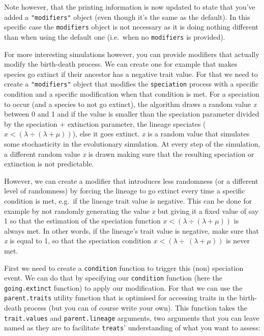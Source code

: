 \documentclass[
]{book}
\begin{document}
Note however, that the printing information is now updated to state that you've added a \texttt{"modifiers"} object (even though it's the same as the default).
In this specific case the \texttt{modifiers} object is not necessary as it is doing nothing different than when using the default one (i.e.~when no \texttt{modifiers} is provided).

For more interesting simulations however, you can provide modifiers that actually modify the birth-death process.
We can create one for example that makes species go extinct if their ancestor has a negative trait value.
For that we need to create a \texttt{"modifiers"} object that modifies the \texttt{speciation} process with a specific condition and a specific modification when that condition is met.
For a speciation to occur (and a species to not go extinct), the algorithm draws a random value \emph{x} between 0 and 1 and if the value is smaller than the speciation parameter divided by the speciation + extinction parameter, the lineage speciates (\(x < (\lambda \div (\lambda + \mu))\)), else it goes extinct.
\emph{x} is a random value that simulates some stochasticity in the evolutionary simulation.
At every step of the simulation, a different random value \emph{x} is drawn making sure that the resulting speciation or extinction is not predictable.

However, we can create a modifier that introduces less randomness (or a different level of randomness) by forcing the lineage to go extinct every time a specific condition is met, e.g.~if the lineage trait value is negative.
This can be done for example by not randomly generating the value \emph{x} but giving it a fixed value of say 1 so that the estimation of the speciation function \(x < (\lambda \div (\lambda + \mu))\) is always met.
In other words, if the lineage's trait value is negative, make sure that \emph{x} is equal to 1, so that the speciation condition \(x < (\lambda \div\ (\lambda + \mu))\) is never met.

First we need to create a \texttt{condition} function to trigger this (non) speciation event.
We can do that by specifying our \texttt{condition} function (here the \texttt{going.extinct} function) to apply our modification.
For that we can use the \texttt{parent.traits} utility function that is optimised for accessing traits in the birth-death process (but you can of course write your own).
This function takes the \texttt{trait.values} and \texttt{parent.lineage} arguments, two arguments that you can leave named as they are to facilitate \texttt{treats}' understanding of what you want to assess:
\end{document}
